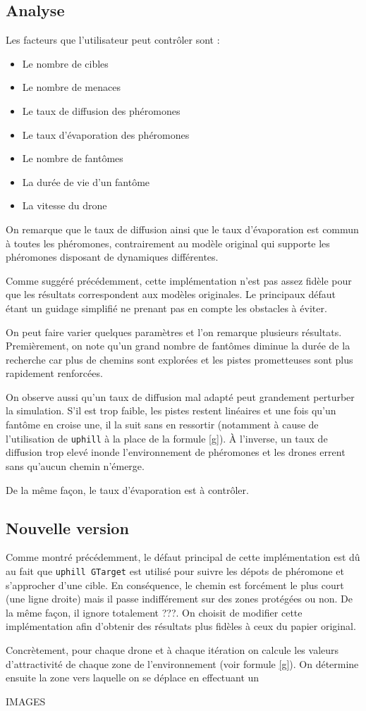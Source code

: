 \documentclass[12pt]{article}
\begin{document}
\subsection{Analyse}

Les facteurs que l'utilisateur peut contrôler sont :

\begin{itemize}
\item{Le nombre de cibles}
\item{Le nombre de menaces}
\item{Le taux de diffusion des phéromones}
\item{Le taux d'évaporation des phéromones}
\item{Le nombre de fantômes}
\item{La durée de vie d'un fantôme}
\item{La vitesse du drone}
\end{itemize}

On remarque que le taux de diffusion ainsi que le taux d'évaporation
est commun à toutes les phéromones, contrairement au modèle original
qui supporte les phéromones disposant de dynamiques différentes.

Comme suggéré précédemment, cette implémentation n'est pas assez
fidèle pour que les résultats correspondent aux modèles originales. Le
principaux défaut étant un guidage simplifié ne prenant pas en compte
les obstacles à éviter.

On peut faire varier quelques paramètres et l'on remarque plusieurs
résultats. Premièrement, on note qu'un grand nombre de fantômes
diminue la durée de la recherche car plus de chemins sont explorées et
les pistes prometteuses sont plus rapidement renforcées.

On observe aussi qu'un taux de diffusion mal adapté peut grandement
perturber la simulation. S'il est trop faible, les pistes restent
linéaires et une fois qu'un fantôme en croise une, il la suit sans en
ressortir (notamment à cause de l'utilisation de \texttt{uphill} à la
place de la formule \ref{g}). \`A l'inverse, un taux de diffusion trop
elevé inonde l'environnement de phéromones et les drones errent sans
qu'aucun chemin n'émerge.

De la même façon, le taux d'évaporation est à contrôler.
\subsection{Nouvelle version}

Comme montré précédemment, le défaut principal de cette implémentation
est dû au fait que \texttt{uphill GTarget} est utilisé pour suivre les
dépots de phéromone et s'approcher d'une cible. En conséquence, le
chemin est forcément le plus court (une ligne droite) mais il passe
indifférement sur des zones protégées ou non. De la même façon, il
ignore totalement ???. On choisit de modifier cette implémentation
afin d'obtenir des résultats plus fidèles à ceux du papier original.

Concrètement, pour chaque drone et à chaque itération on calcule les
valeurs d'attractivité de chaque zone de l'environnement (voir formule
\ref{g}). On détermine ensuite la zone vers laquelle on se déplace en
effectuant un

IMAGES



\end{document}

